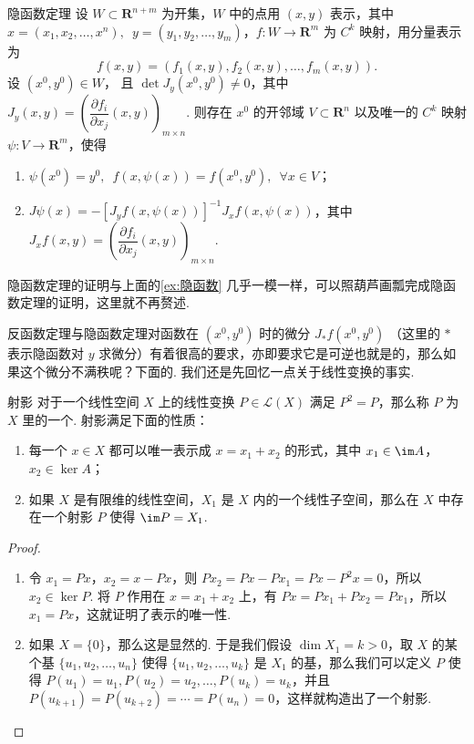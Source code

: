 \begin{theorem}{隐函数定理}{}
    设 $W\subset \mathbf{R}^{n+m}$ 为开集，$W$ 中的点用 $(x, y)$ 表示，其中 $x = (x_1, x_2, \ldots, x^n), \enspace y = (y_1, y_2, \ldots, y_m)$，$f\colon W\to \mathbf{R}^m$ 为 $C^k$ 映射，用分量表示为 \[f(x, y) = (f_1(x, y), f_2(x, y), \ldots, f_m(x, y)).\]
    设 $(x^0, y^0)\in W$， 且 $\det J_y(x^0, y^0)\neq 0$，其中 $J_y(x, y) = \left(\dfrac{\partial f_i}{\partial x_j}(x, y)\right)_{m\times n}$. 则存在 $x^0$ 的开邻域 $V\subset \mathbf{R}^n$ 以及唯一的 $C^k$ 映射 $\psi\colon V\to \mathbf{R}^m$，使得
    \begin{enumerate}[label=(\arabic*)]
        \item $\psi(x^0) = y^0,\enspace f(x, \psi(x)) = f(x^0, y^0),\enspace \forall x\in V$；
        \item $J\psi(x) = -[J_yf(x, \psi(x))]^{-1}J_xf(x, \psi(x))$，其中 $J_xf(x, y) = \left(\dfrac{\partial f_i}{\partial x_j}(x, y)\right)_{m\times n}$.
    \end{enumerate}
\end{theorem}

隐函数定理的证明与上面的\autoref{ex:隐函数} 几乎一模一样，可以照葫芦画瓢完成隐函数定理的证明，这里就不再赘述.

反函数定理与隐函数定理对函数在 $(x^0, y^0)$ 时的微分 $J_*f(x^0, y^0)$ （这里的 $*$ 表示隐函数对 $y$ 求微分）有着很高的要求，亦即要求它是可逆也就是的，那么如果这个微分不满秩呢？下面的. 我们还是先回忆一点关于线性变换的事实.

\begin{theorem}{射影}{}
    对于一个线性空间 $X$ 上的线性变换 $P\in \mathcal{L}(X)$ 满足 $P^2 = P$，那么称 $P$ 为 $X$ 里的一个. 射影满足下面的性质：
    \begin{enumerate}[label=(\arabic*)]
        \item 每一个 $x\in X$ 都可以唯一表示成 $x = x_1+x_2$ 的形式，其中 $x_1\in\im A$，$x_2\in\ker A$；
        \item 如果 $X$ 是有限维的线性空间，$X_1$ 是 $X$ 内的一个线性子空间，那么在 $X$ 中存在一个射影 $P$ 使得 $\im P = X_1$.
    \end{enumerate}
\end{theorem}

\begin{proof}
    \begin{enumerate}[label=(\arabic*)]
        \item 令 $x_1 = Px$，$x_2 = x - Px$，则 $Px_2 = Px - Px_1 = Px - P^2x = 0$，所以 $x_2\in\ker P$. 将 $P$ 作用在 $x = x_1 + x_2$ 上，有 $Px = Px_1 + Px_2 = Px_1$，所以 $x_1 = Px$，这就证明了表示的唯一性.
        \item  如果 $X = \{0\}$，那么这是显然的. 于是我们假设 $\dim X_1 = k >0$，取 $X$ 的某个基 $\{u_1, u_2, \ldots, u_n\}$ 使得 $\{u_1, u_2, \ldots, u_k\}$ 是 $X_1$ 的基，那么我们可以定义 $P$ 使得 $P(u_1) = u_1, P(u_2) = u_2, \ldots, P(u_k) = u_k$，并且 $P(u_{k+1}) = P(u_{k+2}) = \cdots = P(u_n) = 0$，这样就构造出了一个射影.
    \end{enumerate}
\end{proof}

